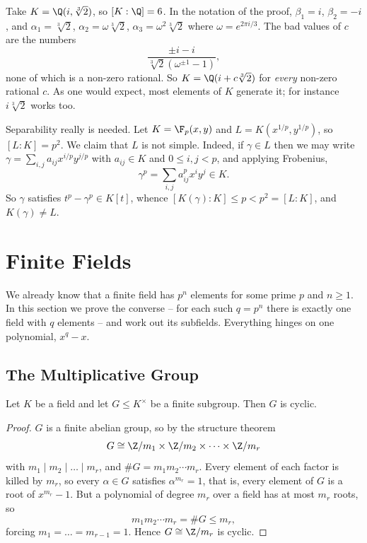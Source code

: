 \begin{example}
	Take $K = \Q(i, \sqrt[3]2)$, so $[K:\Q] = 6$. In the notation of the proof, $\beta_1 = i$, $\beta_2 = -i$, and $\alpha_1 = \sqrt[3]2$, $\alpha_2 = \omega\sqrt[3]2$, $\alpha_3 = \omega^2\sqrt[3]2$ where $\omega = e^{2\pi i /3}$. The bad values of $c$ are the numbers
	$$\frac{\pm i - i}{\sqrt[3]{2}(\omega^{\pm 1} - 1)},$$
	none of which is a non-zero rational. So $K = \Q(i + c\sqrt[3]2)$ for \emph{every} non-zero rational $c$. As one would expect, most elements of $K$ generate it; for instance $i\sqrt[3]2$ works too.
\end{example}

\begin{example}
	Separability really is needed. Let $K = \F_p(x,y)$ and $L = K(x^{1/p}, y^{1/p})$, so $[L:K] = p^2$. We claim that $L$ is not simple. Indeed, if $\gamma \in L$ then we may write $\gamma = \sum_{i,j} a_{ij}x^{i/p}y^{j/p}$ with $a_{ij} \in K$ and $0 \leq i,j < p$, and applying Frobenius,
	$$\gamma^p = \sum_{i,j} a_{ij}^p x^i y^j \in K.$$
	So $\gamma$ satisfies $t^p - \gamma^p \in K[t]$, whence $[K(\gamma):K] \leq p < p^2 = [L:K]$, and $K(\gamma) \neq L$.
\end{example}

\section{Finite Fields}

We already know that a finite field has $p^n$ elements for some prime $p$ and $n \geq 1$. In this section we prove the converse -- for each such $q = p^n$ there is exactly one field with $q$ elements -- and work out its subfields. Everything hinges on one polynomial, $x^q - x$.

\subsection{The Multiplicative Group}

\begin{proposition}\label{prop:cyclic}
	Let $K$ be a field and let $G \leq K^\times$ be a finite subgroup. Then $G$ is cyclic.
\end{proposition}

\begin{proof}
	$G$ is a finite abelian group, so by the structure theorem
	$$G \cong \Z/m_1 \times \Z/m_2 \times \dots \times \Z/m_r$$
	with $m_1 \mid m_2 \mid \dots \mid m_r$, and $\#G = m_1m_2\cdots m_r$. Every element of each factor is killed by $m_r$, so every $\alpha \in G$ satisfies $\alpha^{m_r} = 1$, that is, every element of $G$ is a root of $x^{m_r}-1$. But a polynomial of degree $m_r$ over a field has at most $m_r$ roots, so
	$$m_1m_2\cdots m_r = \#G \leq m_r,$$
	forcing $m_1 = \dots = m_{r-1} = 1$. Hence $G \cong \Z/m_r$ is cyclic.
\end{proof}

